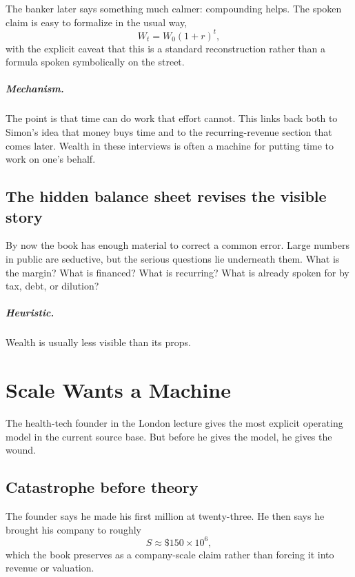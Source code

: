 \documentclass[11pt,oneside]{book}
\begin{document}
The banker later says something much calmer: compounding helps. The spoken claim is easy to formalize in the usual way,
\begin{equation}
W_t = W_0(1+r)^t,
\end{equation}
with the explicit caveat that this is a standard reconstruction rather than a formula spoken symbolically on the street.

\paragraph{Mechanism.} The point is that time can do work that effort cannot. This links back both to Simon's idea that money buys time and to the recurring-revenue section that comes later. Wealth in these interviews is often a machine for putting time to work on one's behalf.

\section{The hidden balance sheet revises the visible story}

By now the book has enough material to correct a common error. Large numbers in public are seductive, but the serious questions lie underneath them. What is the margin? What is financed? What is recurring? What is already spoken for by tax, debt, or dilution?

\paragraph{Heuristic.} Wealth is usually less visible than its props.

\chapter{Scale Wants a Machine}

The health-tech founder in the London lecture gives the most explicit operating model in the current source base. But before he gives the model, he gives the wound.

\section{Catastrophe before theory}

The founder says he made his first million at twenty-three. He then says he brought his company to roughly
\begin{equation}
S \approx \$150 \times 10^6,
\end{equation}
which the book preserves as a company-scale claim rather than forcing it into revenue or valuation.
\end{document}
